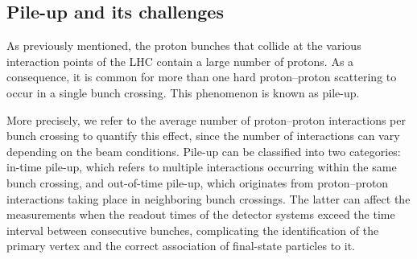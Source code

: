 \subsection{Pile-up and its challenges}

As previously mentioned, the proton bunches that collide at the various interaction points of the LHC contain a large number of protons. As a consequence, it is common for more than one hard proton--proton scattering to occur in a single bunch crossing. This phenomenon is known as pile-up.

More precisely, we refer to the average number of proton--proton interactions per bunch crossing to quantify this effect, since the number of interactions can vary depending on the beam conditions. Pile-up can be classified into two categories: in-time pile-up, which refers to multiple interactions occurring within the same bunch crossing, and out-of-time pile-up, which originates from proton--proton interactions taking place in neighboring bunch crossings. The latter can affect the measurements when the readout times of the detector systems exceed the time interval between consecutive bunches, complicating the identification of the primary vertex and the correct association of final-state particles to it.

